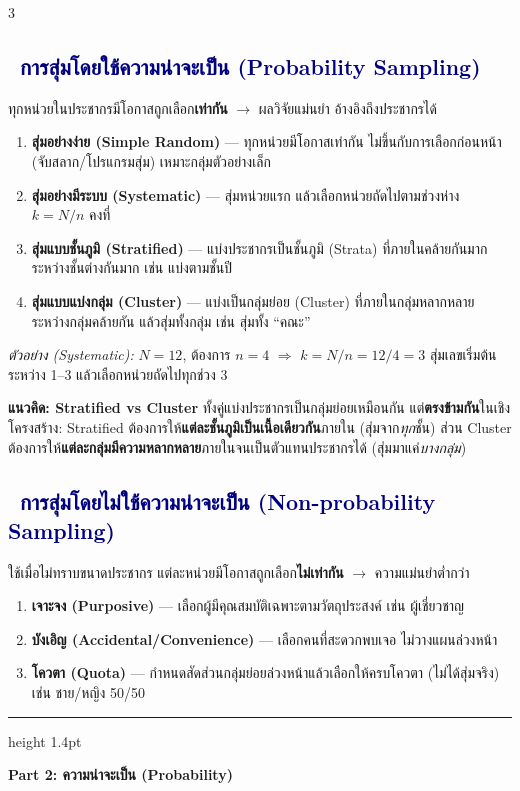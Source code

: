 \documentclass[9pt]{extarticle}
\newcommand{\dist}[1]{\subsection*{\textcolor{navy}{\textbullet\ #1}}}
\begin{document}
\begin{multicols}{3}
\dist{การสุ่มโดยใช้ความน่าจะเป็น (Probability Sampling)}
ทุกหน่วยในประชากรมีโอกาสถูกเลือก\textbf{เท่ากัน} $\to$ ผลวิจัยแม่นยำ อ้างอิงถึงประชากรได้
\begin{enumerate}
\item \textbf{สุ่มอย่างง่าย (Simple Random)} — ทุกหน่วยมีโอกาสเท่ากัน ไม่ขึ้นกับการเลือกก่อนหน้า (จับสลาก/โปรแกรมสุ่ม) เหมาะกลุ่มตัวอย่างเล็ก
\item \textbf{สุ่มอย่างมีระบบ (Systematic)} — สุ่มหน่วยแรก แล้วเลือกหน่วยถัดไปตามช่วงห่าง $k=N/n$ คงที่
\item \textbf{สุ่มแบบชั้นภูมิ (Stratified)} — แบ่งประชากรเป็นชั้นภูมิ (Strata) ที่ภายในคล้ายกันมาก ระหว่างชั้นต่างกันมาก เช่น แบ่งตามชั้นปี
\item \textbf{สุ่มแบบแบ่งกลุ่ม (Cluster)} — แบ่งเป็นกลุ่มย่อย (Cluster) ที่ภายในกลุ่มหลากหลาย ระหว่างกลุ่มคล้ายกัน แล้วสุ่มทั้งกลุ่ม เช่น สุ่มทั้ง ``คณะ''
\end{enumerate}
\begin{solbox}
\textit{ตัวอย่าง (Systematic):} $N=12$, ต้องการ $n=4$ $\Rightarrow$ $k=N/n=12/4=3$ สุ่มเลขเริ่มต้นระหว่าง 1--3 แล้วเลือกหน่วยถัดไปทุกช่วง 3
\end{solbox}
\begin{ideabox}
\textbf{แนวคิด: Stratified vs Cluster} ทั้งคู่แบ่งประชากรเป็นกลุ่มย่อยเหมือนกัน แต่\textbf{ตรงข้ามกัน}ในเชิงโครงสร้าง: Stratified ต้องการให้\textbf{แต่ละชั้นภูมิเป็นเนื้อเดียวกัน}ภายใน (สุ่มจาก\textit{ทุก}ชั้น) ส่วน Cluster ต้องการให้\textbf{แต่ละกลุ่มมีความหลากหลาย}ภายในจนเป็นตัวแทนประชากรได้ (สุ่มมาแค่\textit{บางกลุ่ม})
\end{ideabox}

\dist{การสุ่มโดยไม่ใช้ความน่าจะเป็น (Non-probability Sampling)}
ใช้เมื่อไม่ทราบขนาดประชากร แต่ละหน่วยมีโอกาสถูกเลือก\textbf{ไม่เท่ากัน} $\to$ ความแม่นยำต่ำกว่า
\begin{enumerate}
\item \textbf{เจาะจง (Purposive)} — เลือกผู้มีคุณสมบัติเฉพาะตามวัตถุประสงค์ เช่น ผู้เชี่ยวชาญ
\item \textbf{บังเอิญ (Accidental/Convenience)} — เลือกคนที่สะดวกพบเจอ ไม่วางแผนล่วงหน้า
\item \textbf{โควตา (Quota)} — กำหนดสัดส่วนกลุ่มย่อยล่วงหน้าแล้วเลือกให้ครบโควตา (ไม่ได้สุ่มจริง) เช่น ชาย/หญิง 50/50
\end{enumerate}

\end{multicols}

\vspace{4pt}
{\color{gold}\hrule height 1.4pt}
\vspace{3pt}
\begin{center}
{\bfseries\color{navy} Part 2: ความน่าจะเป็น (Probability)}
\end{center}
\vspace{2pt}
\end{document}

